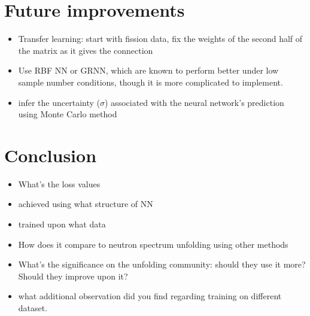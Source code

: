 \documentclass[a4paper, 12pt]{article}
\newcommand{\pythoncode}[2]{
\begin{adjustwidth}{-1.3cm}{-1.3cm}
\texttt{#1}
\inputpython{#2}{1}{1500}
\end{adjustwidth}
}
\begin{document}
\section{Future improvements}
\begin{itemize}
    \item Transfer learning: start with fission data, fix the weights of the second half of the matrix as it gives the connection
    \item Use RBF NN or GRNN, which are known to perform better under low sample number conditions, though it is more complicated to implement.
    \item infer the uncertainty ($\sigma$) associated with the neural network's prediction using Monte Carlo method
\end{itemize}

\section{Conclusion}
\begin{itemize}
    \item What's the loss values
    \item achieved using what structure of NN
    \item trained upon what data
    \item How does it compare to neutron spectrum unfolding using other methods
    \item What's the significance on the unfolding community: should they use it more? Should they improve upon it?
    \item what additional observation did you find regarding training on different dataset.
\end{itemize}






\end{document}
